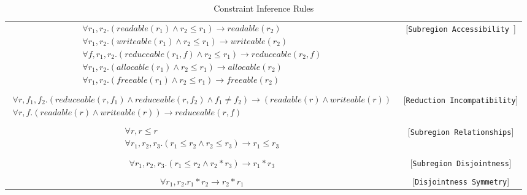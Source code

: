 \documentclass{article}
\begin{document}
\begin{table*}
\centering
{\small
\begin{tabular}{cc}
%
%
\begin{math}
\begin{array}{c}
\forall r_1, r_2. (readable(r_1) \wedge r_2 \le r_1) \rightarrow readable(r_2) \\
\forall r_1, r_2. (writeable(r_1) \wedge r_2 \le r_1) \rightarrow writeable(r_2) \\
\forall f, r_1, r_2. (reduceable(r_1,f) \wedge r_2 \le r_1) \rightarrow reduceable(r_2,f) \\
\forall r_1, r_2. (allocable(r_1) \wedge r_2 \le r_1) \rightarrow allocable(r_2) \\
\forall r_1, r_2. (freeable(r_1) \wedge r_2 \le r_1) \rightarrow freeable(r_2)
\end{array}
\end{math} & [{\tt Subregion Accessibility }] \\
\\
\begin{math}
\begin{array}{c}
\forall r, f_1, f_2. (reduceable(r,f_1) \wedge reduceable(r,f_2) \wedge f_1 \ne f_2) \rightarrow (readable(r) \wedge writeable(r)) \\
\forall r, f. (readable(r) \wedge writeable(r)) \rightarrow reduceable(r,f) 
\end{array}
\end{math} & [{\tt Reduction Incompatibility}] \\
\\
%
%
\begin{math}
\begin{array}{c}
\forall r, r \le r \\
\forall r_1, r_2, r_3. (r_1 \le r_2 \wedge r_2 \le r_3) \rightarrow r_1 \le r_3
\end{array}
\end{math} & [{\tt Subregion Relationships}] \\
\\
\begin{math}
\forall r_1, r_2, r_3. (r_1 \le r_2 \wedge r_2 * r_3) \rightarrow r_1 * r_3
\end{math} & [{\tt Subregion Disjointness}] \\
\\
\begin{math}
\forall r_1, r_2. r_1 * r_2 \rightarrow r_2 * r_1
\end{math} & [{\tt Disjointness Symmetry}]
\end{tabular}
}
\caption{Constraint Inference Rules}
\end{table*}
\end{document}
